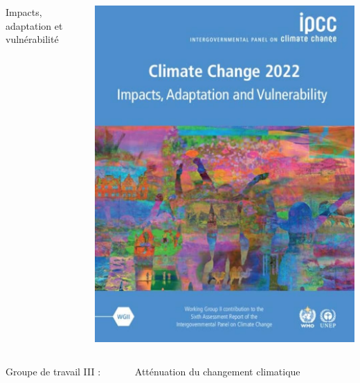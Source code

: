 \documentclass{beamer}
\begin{document}
\begin{frame}
\begin{columns}
\begin{column}{0.55\textwidth}
Impacts, adaptation et vulnérabilité
\end{column}
\begin{column}{0.2\textwidth}
  \includegraphics[scale=0.073]{images/IPCC_AR6_WGII.jpg}
\end{column}
\end{columns}
\vspace{0.3cm}
\begin{columns}
  \begin{column}{0.2\textwidth}
Groupe de travail III : 
\end{column}
\begin{column}{0.55\textwidth}
Atténuation du changement climatique
\end{column}
\begin{column}{0.2\textwidth}

\end{column}
\end{columns}
\end{frame}
\end{document}
